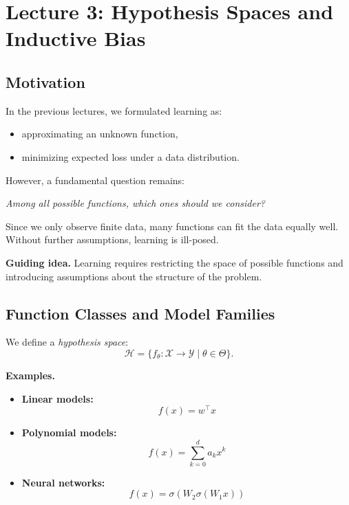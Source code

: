 \section{Lecture 3: Hypothesis Spaces and Inductive Bias}

\subsection{Motivation}

In the previous lectures, we formulated learning as:
\begin{itemize}
    \item approximating an unknown function,
    \item minimizing expected loss under a data distribution.
\end{itemize}

\medskip

\noindent
However, a fundamental question remains:

\medskip

\noindent
\textit{Among all possible functions, which ones should we consider?}

\medskip

\noindent
Since we only observe finite data, many functions can fit the data equally well. Without further assumptions, learning is ill-posed.

\medskip

\noindent
\textbf{Guiding idea.}  
Learning requires restricting the space of possible functions and introducing assumptions about the structure of the problem.

\subsection{Function Classes and Model Families}

We define a \emph{hypothesis space}:
\[
\mathcal{H} = \{ f_\theta : \mathcal{X} \to \mathcal{Y} \mid \theta \in \Theta \}.
\]

\medskip

\noindent
\textbf{Examples.}

\begin{itemize}
    \item \textbf{Linear models:}
    \[
    f(x) = w^\top x
    \]

    \item \textbf{Polynomial models:}
    \[
    f(x) = \sum_{k=0}^d a_k x^k
    \]

    \item \textbf{Neural networks:}
    \[
    f(x) = \sigma(W_2 \sigma(W_1 x))
    \]
\end{itemize}


